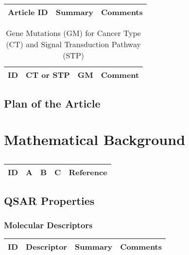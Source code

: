 \begin{table}[H]\centering
	\begin{tabular}{p{1cm}p{4cm}p{3cm}}
		Article ID & Summary & Comments\\
		\hline
		\hline
	\end{tabular}
\end{table}


\begin{table}[H]
\tiny
\caption{Gene Mutations (GM) for Cancer Type (CT) and Signal Transduction Pathway (STP)}
\begin{tabular}{rp{2cm}p{4cm}p{0.5cm}}
\hline 
ID & CT or STP & GM & Comment \\ 
\hline 	
\hline
\end{tabular}
\end{table}

\subsection{Plan of the Article}

\begin{enumerate}
\end{enumerate}


\section{Mathematical Background}

\centering
\begin{table}[H]\footnotesize
	\caption{}
	\begin{tabular}{rp{1cm}p{2cm}p{3cm}p{1cm}}
		\hline
		ID & A & B & C & Reference \\
		\hline
		\hline
	\end{tabular}
\end{table}
\raggedright

\subsection{QSAR Properties}

\subsubsection{Molecular Descriptors}

\begin{table}[H]\centering
	\begin{tabular}{p{1cm}p{2cm}p{4cm}p{3cm}}
		ID & Descriptor & Summary & Comments\\
		\hline
		\hline
	\end{tabular}
\end{table}


